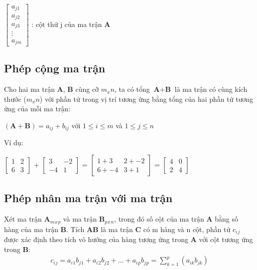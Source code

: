 	
	$\begin{bmatrix}	
		 a_{j1} \\ a_{j2}\\ a_{j3} \\ \vdots \\ a_{jm}		\end{bmatrix}$ : 
	  cột thứ j của ma trận \textbf{A}\\

\subsection{Phép cộng ma trận}
 Cho hai ma trận \textbf{A}, \textbf{B} cùng cỡ  $ m_x n$, ta có tổng $\textbf{A} + \textbf{B}$ là ma trận có cùng kích thước ($m_x n$) với phần tử trong vị trí tương ứng bằng tổng của hai phần tử tương ứng của mỗi ma trận:
\begin{center}
$(\textbf{A}+\textbf{B}) = a_{ij}+b_{ij}$ với $ 1 \leq i \leq m$ và $1 \leq j \leq n$

\end{center}

Ví dụ:

$\begin{bmatrix}
   1 & 2 \\6 & 3
\end{bmatrix}$
+ 
$\begin{bmatrix}
3 & -2 \\
-4 & 1
\end{bmatrix}$
=
$\begin{bmatrix}
1+3 & 2 + -2 \\
6+-4 & 3+1
\end{bmatrix}$
=
$\begin{bmatrix}
4& 0\\
2 & 4
\end{bmatrix}$


\subsection{Phép nhân ma trận với ma trận}
Xét ma trận $\textbf{A}_m{}_x{}_p$ và ma trận \textbf{B}$_p{}_x{}_n$, trong đó số cột của ma trận \textbf{A} bằng số hàng của ma trận \textbf{B}.
 Tích \textbf{A}\textbf{B} là ma trận \textbf{C} có m hàng và n cột, phần tử $c_i{}_j$ được xác định theo tích vô hướng của hàng tương ứng trong \textbf{A} với cột tương ứng trong \textbf{B}: 
\begin{align*}
c_i{}_j = a_i{}_1b_j{}_1 + a_i{}_2b_j{}_2 + \ldots + a_i{}_pb_j{}_p=
\sum_{k=1}^p(a_{ik}b_{jk})
\end{align*}


